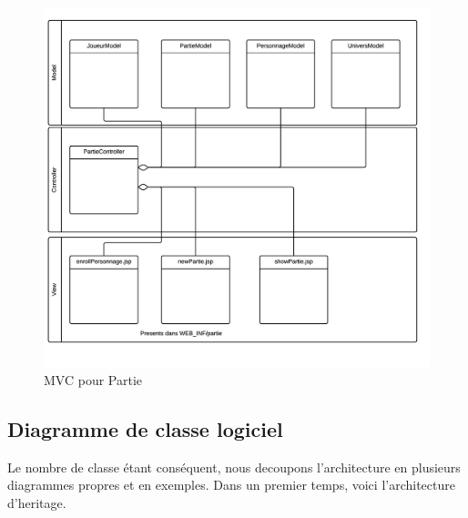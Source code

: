 \documentclass[a4paper,oneside,10pt]{article}
\begin{document}
\begin{figure}[H]
	\begin{center}
		\includegraphics[width=\textwidth]{images/MVC/model1.png}  
		\caption{MVC pour Partie}
	\end{center}
\end{figure}


\subsection{Diagramme de classe logiciel}

Le nombre de classe étant conséquent, nous decoupons l'architecture en plusieurs diagrammes propres et en exemples. Dans un premier temps, voici l'architecture d'heritage.  
\end{document}
